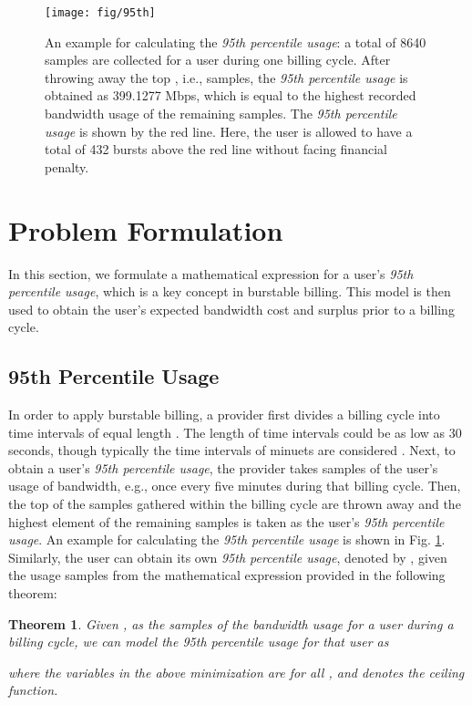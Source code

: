 \documentclass[10pt,journal,compsoc]{IEEEtran}
\newtheorem{theorem}{Theorem}
\begin{document}
 \begin{figure}[!t]
	\centering
	\texttt{[image: fig/95th]}
	\caption{An example for calculating the \emph{95th percentile usage}:
a total of 8640 samples are collected for a user during one billing cycle. After throwing away the top
, i.e.,   samples, the \emph{95th percentile usage}
is obtained as 399.1277 Mbps, which is equal to the highest recorded bandwidth usage  of the remaining  samples.
The \emph{95th percentile usage} is shown by the red line.
Here, the user is allowed to have a
total of 432 bursts above the red line without facing financial penalty.}\label{fig:95th}
\end{figure}
\section{Problem Formulation}
In this section, we formulate a mathematical expression for a  user's \emph{95th percentile usage}, which is a key concept in burstable billing. This model is then used to obtain the user's expected bandwidth cost and surplus prior to a billing cycle.

\subsection{95th Percentile Usage}\label{subsec:95thpercentileusage}
In order to apply burstable billing, a provider first divides a
billing cycle into   time intervals of equal length . The
length of time intervals could be as low as 30 seconds,
though typically the time intervals of  minuets are
considered \cite{Dimitropoulos2009}. Next, to obtain a user's \emph{95th percentile usage}, the provider takes
 samples of the user's usage of bandwidth, e.g., once every five minutes during  that billing cycle. Then, the top  of the samples gathered within the billing cycle are thrown away and  the highest element of the remaining  samples is taken as the user's \emph{95th percentile usage}. An example for calculating the \emph{95th percentile usage} is shown in Fig. \ref{fig:95th}. Similarly, the user can obtain its own \emph{95th percentile usage}, denoted by , given the usage samples  from the mathematical expression provided in the following theorem:  

\vspace{0.1cm}

\begin{theorem} \label{theorem1}
Given ,   as the  samples of the bandwidth usage for a user during a billing cycle, we can model the \emph{95th percentile usage} for that user as

where the variables in the above minimization are  for all , and  denotes the ceiling function. \end{theorem}
\end{document}
